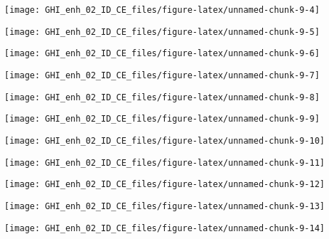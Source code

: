 \documentclass[
  10pt,
  a4paper,oneside]{article}
\begin{document}
\begin{center}\texttt{[image: GHI\_enh\_02\_ID\_CE\_files/figure-latex/unnamed-chunk-9-4]} \end{center}

\begin{center}\texttt{[image: GHI\_enh\_02\_ID\_CE\_files/figure-latex/unnamed-chunk-9-5]} \end{center}

\begin{center}\texttt{[image: GHI\_enh\_02\_ID\_CE\_files/figure-latex/unnamed-chunk-9-6]} \end{center}

\begin{center}\texttt{[image: GHI\_enh\_02\_ID\_CE\_files/figure-latex/unnamed-chunk-9-7]} \end{center}

\begin{center}\texttt{[image: GHI\_enh\_02\_ID\_CE\_files/figure-latex/unnamed-chunk-9-8]} \end{center}

\begin{center}\texttt{[image: GHI\_enh\_02\_ID\_CE\_files/figure-latex/unnamed-chunk-9-9]} \end{center}

\begin{center}\texttt{[image: GHI\_enh\_02\_ID\_CE\_files/figure-latex/unnamed-chunk-9-10]} \end{center}

\begin{center}\texttt{[image: GHI\_enh\_02\_ID\_CE\_files/figure-latex/unnamed-chunk-9-11]} \end{center}

\begin{center}\texttt{[image: GHI\_enh\_02\_ID\_CE\_files/figure-latex/unnamed-chunk-9-12]} \end{center}

\begin{center}\texttt{[image: GHI\_enh\_02\_ID\_CE\_files/figure-latex/unnamed-chunk-9-13]} \end{center}

\begin{center}\texttt{[image: GHI\_enh\_02\_ID\_CE\_files/figure-latex/unnamed-chunk-9-14]} \end{center}
\end{document}
